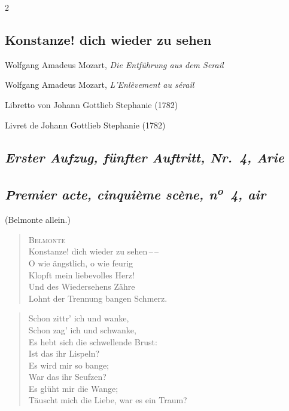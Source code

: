 \documentclass[a4paper,12pt]{article}
\newcommand\chunks[2]{%
\begin{leftcolumn*}\begin{otherlanguage}{german}%
{#1}%
\end{otherlanguage}\end{leftcolumn*}%
\begin{rightcolumn}\begin{otherlanguage}{french}%
{#2}%
\end{otherlanguage}\end{rightcolumn}%
}
\newcommand\strophe[1]{\subsection*{\normalsize\normalfont\itshape #1}}
\begin{document}
\thispagestyle{empty}
\setlength{\columnsep}{8mm}


\begin{paracol}{2}

  \chunks{\section*{Konstanze! dich wieder zu sehen}}
         {}

  \chunks{\noindent\raggedright\small Wolfgang Amadeus Mozart, \textit{Die Entführung aus dem Serail}}
         {\noindent\raggedright\small Wolfgang Amadeus Mozart, \textit{L’Enlèvement au sérail}}

  \chunks{\noindent\raggedright\small Libretto von Johann Gottlieb Stephanie (1782)}
         {\noindent\raggedright\small Livret de Johann Gottlieb Stephanie (1782)}

  \chunks{\strophe{Erster Aufzug, fünfter Auftritt, Nr.~4, Arie}}
         {\strophe{Premier acte, cinquième scène, n\textsuperscript{o}~4, air}}

  \chunks{\noindent\small(Belmonte allein.)}
         {}

  \chunks{\begin{verse}
          \textsc{Belmonte}\\[\medskipamount]
          Konstanze! dich wieder zu sehen\,--\,--\\
          O wie ängstlich, o wie feurig\\
          Klopft mein liebevolles Herz!\\
          Und des Wiedersehens Zähre\\
          Lohnt der Trennung bangen Schmerz.
          \end{verse}}
         {}

  \chunks{\begin{verse}
          Schon zittr’ ich und wanke,\\
          Schon zag’ ich und schwanke,\\
          Es hebt sich die schwellende Brust:\\
          Ist das ihr Lispeln?\\
          Es wird mir so bange;\\
          War das ihr Seufzen?\\
          Es glüht mir die Wange;\\
          Täuscht mich die Liebe, war es ein Traum?
          \end{verse}}
         {}
\end{paracol}
\end{document}
